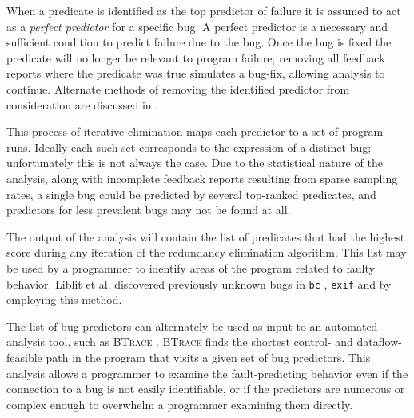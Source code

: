 When a predicate is identified as the top predictor of failure it is assumed to act as a \emph{perfect predictor} for a specific bug.  A perfect predictor is a necessary and sufficient condition to predict failure due to the bug.  Once the bug is fixed the predicate will no longer be relevant to program failure; removing all feedback reports where the predicate was true simulates a bug-fix, allowing analysis to continue.  Alternate methods of removing the identified predictor from consideration are discussed in \cite{Liblit:2005:SSBI}.

This process of iterative elimination maps each predictor to a set of program runs.  Ideally each such set corresponds to the expression of a distinct bug; unfortunately this is not always the case.  Due to the statistical nature of the analysis, along with incomplete feedback reports resulting from sparse sampling rates, a single bug could be predicted by several top-ranked predicates, and predictors for less prevalent bugs may not be found at all.

The output of the analysis will contain the list of predicates that had the highest score during any iteration of the redundancy elimination algorithm.  This list may be used by a programmer to identify areas of the program related to faulty behavior.  Liblit et al. discovered previously unknown bugs in \texttt{bc} \cite{Liblit:2003:BIRPS}, \texttt{exif} \cite{Liblit:2005:SSBI} and \rhythmbox \cite{Liblit:2005:SSBI} by employing this method.

The list of bug predictors can alternately be used as input to an automated analysis tool, such as \textsc{BTrace} \cite{Lal:2006:POPAD}. \textsc{BTrace} finds the shortest control- and dataflow-feasible path in the program that visits a given set of bug predictors.  This analysis allows a programmer to examine the fault-predicting behavior even if the connection to a bug is not easily identifiable, or if the predictors are numerous or complex enough to overwhelm a programmer examining them directly.

